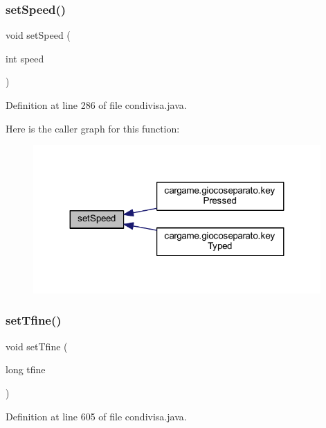 \subsubsection{\texorpdfstring{set\+Speed()}{setSpeed()}}
{\footnotesize\ttfamily void set\+Speed (\begin{DoxyParamCaption}\item[{int}]{speed }\end{DoxyParamCaption})}



Definition at line 286 of file condivisa.\+java.

Here is the caller graph for this function\+:
\nopagebreak
\begin{figure}[H]
\begin{center}
\leavevmode
\includegraphics[width=311pt]{classcargame_1_1condivisa_a3b320d14ab676975894c44bd3ed68fbe_icgraph}
\end{center}
\end{figure}
\mbox{\label{classcargame_1_1condivisa_a4a84cdccb50ce3a07a022dbca8b99fe3}} 
\subsubsection{\texorpdfstring{set\+Tfine()}{setTfine()}}
{\footnotesize\ttfamily void set\+Tfine (\begin{DoxyParamCaption}\item[{long}]{tfine }\end{DoxyParamCaption})}



Definition at line 605 of file condivisa.\+java.

